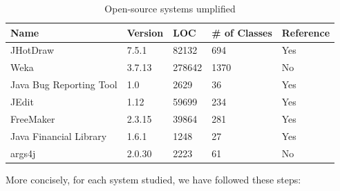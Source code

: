 \begin{table}[h]
\caption{Open-source systems umplified}
\label{table:umplifiedSystems}
\begin{tabularx}{\textwidth}{l|YYYY}
\toprule
{}
\textbf{Name} & \textbf{Version} & \textbf{LOC} & \textbf{\# of Classes}  & \textbf{Reference} \\ \hline
        JHotDraw \cite{jhotdraw}                   & 7.5.1   & 82132   & 694    & Yes       \\ 
 \hline  Weka \cite{wekasvn}                   	   & 3.7.13  & 278642  & 1370   & No        \\ 
\hline   Java Bug Reporting Tool\cite{jbrtsvn} 		& 1.0     & 2629    & 36     & Yes       \\ 
\hline   JEdit\cite{jeditsvn}                   	& 1.12    & 59699   & 234    & Yes       \\ 
\hline   FreeMaker\cite{freemakersvn}               & 2.3.15  & 39864   & 281    & Yes       \\ 
\hline   Java Financial Library\cite{jflsvn}  		& 1.6.1   & 1248    & 27     & Yes       \\ 
\hline   args4j\cite{args4jsvn}                 	 & 2.0.30  & 2223    & 61     & No        \\
\hline
\end{tabularx}
\end{table}

More concisely, for each system studied, we have followed these steps:

